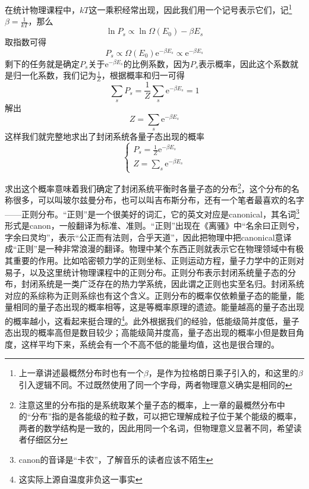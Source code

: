 \documentclass[../../main.tex]{subfiles}
\begin{document}
在统计物理课程中，\(kT\)这一乘积经常出现，因此我们用一个记号表示它们，记\footnote{上一章讲述最概然分布时也有一个\(\beta\)，是作为拉格朗日乘子引入的，和这里的\(\beta\)引入逻辑不同。不过既然使用了同一个字母，两者物理意义确实是相同的}\(\beta=\frac{1}{kT}\)，那么
\begin{equation*}
    \ln P_s\propto\ln\Omega(E_0)-\beta E_s
\end{equation*}
取指数可得
\begin{equation}
    P_s\propto \Omega(E_0)\mathrm{e}^{-\beta E_s}\propto\mathrm{e}^{-\beta E_s}
\end{equation}
剩下的任务就是确定\(P_s\)关于\(\mathrm{e}^{-\beta E_s}\)的比例系数，因为\(P_s\)表示概率，因此这个系数就是归一化系数，我们记为\(\frac{1}{Z}\)，根据概率和归一可得
\begin{equation*}
    \sum_s P_s=\frac{1}{Z}\sum_s \mathrm{e}^{-\beta E_s}=1
\end{equation*}
解出
\begin{equation}
    Z=\sum_s \mathrm{e}^{-\beta E_s}
\end{equation}
这样我们就完整地求出了封闭系统各量子态出现的概率
\begin{equation}
    \begin{cases}
        \displaystyle P_s=\frac{1}{Z}\mathrm{e}^{-\beta E_s} \\
        \displaystyle Z=\sum_s \mathrm{e}^{-\beta E_s}
    \end{cases}
\end{equation}

求出这个概率意味着我们确定了封闭系统平衡时各量子态的分布\footnote{注意这里的分布指的是系统取某个量子态的概率，上一章的最概然分布中的“分布”指的是各能级的粒子数，可以把它理解成粒子位于某个能级的概率，两者的数学结构是一致的，因此用同一个名词，但物理意义显著不同，希望读者仔细区分}，这个分布的名称很多，可以叫玻尔兹曼分布，也可以叫吉布斯分布，还有一个笔者最喜欢的名字——正则分布。“正则”是一个很美好的词汇，它的英文对应是canonical，其名词\footnote{canon的音译是“卡农”，了解音乐的读者应该不陌生}形式是canon，一般翻译为标准、准则。“正则”出现在《离骚》中“名余曰正则兮，字余曰灵均”，表示“公正而有法则，合乎天道”，因此把物理中把canonical意译成“正则”是一种非常浪漫的翻译。物理中某个东西正则就表示它在物理领域中有极其重要的作用。比如哈密顿力学的正则坐标、正则运动方程，量子力学中的正则对易子，以及这里统计物理课程中的正则分布。正则分布表示封闭系统量子态的分布，封闭系统是一类广泛存在的热力学系统，因此谓之正则也实至名归。封闭系统对应的系综称为正则系综也有这个含义。正则分布的概率仅依赖量子态的能量，能量相同的量子态出现的概率相等，这是等概率原理的遗迹。能量越高的量子态出现的概率越小，这看起来挺合理的\footnote{这实际上源自温度非负这一事实}。此外根据我们的经验，低能级简并度低，量子态出现的概率高但是数目较少；高能级简并度高，量子态出现的概率小但是数目角度，这样平均下来，系统会有一个不高不低的能量均值，这也是很合理的。
\end{document}
